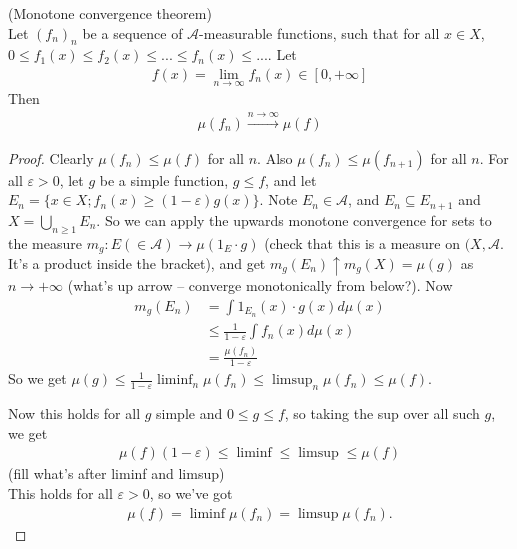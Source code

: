 \documentclass[a4paper]{article}
\begin{document}
\begin{thm} (Monotone convergence theorem)\\
Let $(f_n)_n$ be a sequence of $\mathcal{A}$-measurable functions, such that for all $x \in X$, $0 \leq f_1(x) \leq f_2(x) \leq ... \leq f_n(x) \leq ...$. Let
\begin{equation*}
\begin{aligned}
f(x) = \lim_{n \to \infty} f_n(x) \in [0,+\infty]
\end{aligned}
\end{equation*}
Then
\begin{equation*}
\begin{aligned}
\mu(f_n) \xrightarrow{n \to \infty} \mu(f)
\end{aligned}
\end{equation*}
\begin{proof}
Clearly $\mu(f_n) \leq \mu(f)$ for all $n$. Also $\mu(f_n) \leq \mu(f_{n+1})$ for all $n$. For all $\varepsilon>0$, let $g$ be a simple function, $g \leq f$, and let $E_n =\{x \in X; f_n(x) \geq (1-\varepsilon)g(x)\}$. Note $E_n \in \mathcal{A}$, and $E_n \subseteq E_{n+1}$ and $X = \bigcup_{n \geq 1} E_n$. So we can apply the upwards monotone convergence for sets to the measure $m_g: E (\in \mathcal{A}) \to \mu(1_E \cdot g)$ (check that this is a measure on $(X,\mathcal{A}$. It's a product inside the bracket), and get $m_g(E_n) \uparrow m_g(X) = \mu(g)$ as $n \to +\infty$ (what's up arrow -- converge monotonically from below?). Now
\begin{equation*}
\begin{aligned}
m_g(E_n) &= \int 1_{E_n} (x) \cdot g(x)  d\mu(x) \\
&\leq \frac{1}{1-\varepsilon}\int f_n (x) d\mu(x)\\
&= \frac{\mu(f_n)}{1-\varepsilon}
\end{aligned}
\end{equation*}
So we get $\mu(g) \leq \frac{1}{1-\varepsilon} \liminf_n \mu(f_n) \leq \limsup_n \mu(f_n) \leq \mu(f)$.

Now this holds for all $g$ simple and $0 \leq g \leq f$, so taking the sup over all such $g$, we get
\begin{equation*}
\begin{aligned}
\mu(f) (1-\varepsilon) \leq \liminf \leq \limsup \leq \mu(f)
\end{aligned}
\end{equation*}
(fill what's after liminf and limsup)\\
This holds for all $\varepsilon>0$, so we've got
\begin{equation*}
\begin{aligned}
\mu(f) = \liminf \mu(f_n) = \limsup \mu(f_n).
\end{aligned}
\end{equation*}
\end{proof}
\end{thm}
\end{document}
